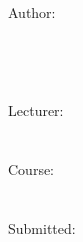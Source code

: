\begin{titlepage}
~\\
~\\
~\\
~\\
\begin{figure}
\hfill
{}
\end{figure}
\begin{center}
~\\
~\\
~\\
\documentType\\
~\\
~\\
\Huge\documentTitle\normalsize\\
~\\
\Large\documentSubTitle\normalsize\\
~\\
~\\
~\\
~\\
~\\
~\\
Author:\\
\documentAuthor\\
\documentAuthorStreet\\
\documentAuthorPostalcode \documentAuthorCity\\
~\\
Lecturer:\\
\documentUniProf\\
~\\
Course:\\
\documentUniCourse\\
~\\
Submitted:\\
\documentDate\\
\end{center}
\end{titlepage}
